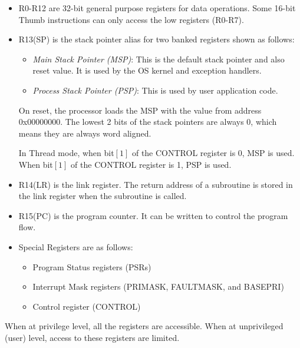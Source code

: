 \begin{itemize}
\item R0-R12 are 32-bit general purpose registers for data operations. Some 16-bit Thumb instructions can only access the low registers (R0-R7).

\item R13(SP) is the stack pointer alias for two banked registers shown as follows: 
    \begin{itemize}
    \item {\em Main Stack Pointer (MSP)}: This is the default stack pointer 
    and also reset value. It is used by the OS kernel and exception handlers. 
    \item {\em Process Stack Pointer (PSP)}: 
    This is used by user application code.
    \end{itemize}
On reset, the processor loads the MSP with the value from address 0x00000000.
The lowest 2 bits of the stack pointers are always 0, which means they are always word aligned.

In Thread mode, when bit$[1]$ of the CONTROL register is 0, MSP is used. When bit$[1]$ of the CONTROL register is 1, PSP is used.
\item R14(LR) is the link register. The return address of a subroutine 
      is stored in the link register when the subroutine is called. 

\item R15(PC) is the program counter. It can be written to control the program flow.
\item Special Registers are as follows:
    \begin{itemize}
    \item Program Status registers (PSRs)
    \item Interrupt Mask registers (PRIMASK, FAULTMASK, and BASEPRI)
    \item Control register (CONTROL)
    \end{itemize}

\end{itemize}
When at privilege level, all the registers are accessible. When at unprivileged (user) level, access to these registers are limited. 

